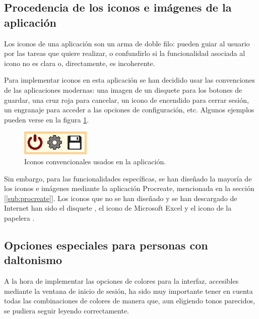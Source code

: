 \subsection{Procedencia de los iconos e imágenes de la aplicación}
Los iconos de una aplicación son un arma de doble filo: pueden guiar al usuario por las tareas que quiere realizar, o confundirlo si la funcionalidad asociada al icono no es clara o, directamente, es incoherente.

Para implementar iconos en esta aplicación se han decidido usar las convenciones de las aplicaciones modernas: una imagen de un disquete para los botones de guardar, una cruz roja para cancelar, un icono de encendido para cerrar sesión, un engranaje para acceder a las opciones de configuración, etc. Algunos ejemplos pueden verse en la figura \ref{Fig:iconosusados}.

\begin{figure}[h]
\centering\includegraphics[width=1\linewidth]{figs/iconosusados.png}
\caption{Iconos convencionales usados en la aplicación.}
\label{Fig:iconosusados}
\end{figure}

Sin embargo, para las funcionalidades específicas, se han diseñado la mayoría de los iconos e imágenes mediante la aplicación Procreate, mencionada en la sección [\ref{sub:procreate}]. Los iconos que no se han diseñado y se han descargado de Internet han sido el disquete \cite{disquete}, el icono de Microsoft Excel \cite{excelicon} y el icono de la papelera \cite{iconsforfree}.

\subsection{Opciones especiales para personas con daltonismo}
A la hora de implementar las opciones de colores para la interfaz, accesibles mediante la ventana de inicio de sesión, ha sido muy importante tener en cuenta todas las combinaciones de colores de manera que, aun eligiendo tonos parecidos, se pudiera seguir leyendo correctamente.


